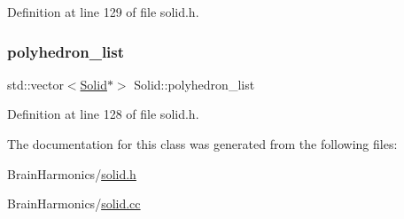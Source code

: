 Definition at line 129 of file solid.\+h.

\mbox{\label{class_solid_a67ef5cdd87e5629159660fa9bb5833c8}} 
\subsubsection{\texorpdfstring{polyhedron\+\_\+list}{polyhedron\_list}}
{\footnotesize\ttfamily std\+::vector$<$\hyperlink{class_solid}{Solid}$\ast$$>$ Solid\+::polyhedron\+\_\+list\hspace{0.3cm}{\ttfamily [protected]}}



Definition at line 128 of file solid.\+h.



The documentation for this class was generated from the following files\+:\begin{DoxyCompactItemize}
\item 
Brain\+Harmonics/\hyperlink{solid_8h}{solid.\+h}\item 
Brain\+Harmonics/\hyperlink{solid_8cc}{solid.\+cc}\end{DoxyCompactItemize}
